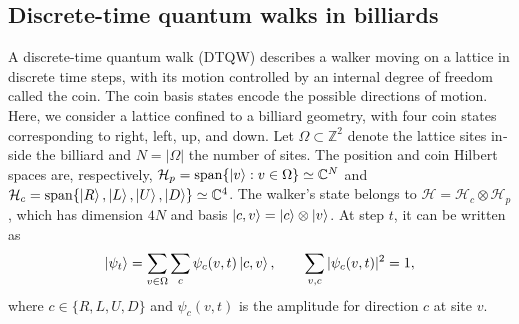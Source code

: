 \tableofcontents
\newpage
\begin{otherlanguage}{english}
\section{Discrete-time quantum walks in billiards} %
\label{sec:dtqw-billiards}

A discrete-time quantum walk (DTQW) describes a walker moving on a lattice 
in discrete time steps, with its motion controlled by an internal degree of 
freedom called the coin. The coin basis states encode the possible directions 
of motion. Here, we consider a lattice confined to a billiard geometry, with 
four coin states corresponding to right, left, up, and down.
Let $\Omega\subset\mathbb Z^2$ denote the lattice sites inside the billiard 
and $N=|\Omega|$ the number of sites. The position and coin Hilbert spaces 
are, respectively,
$\mathcal H_p=\operatorname{span}\{\ket{v}:v\in\Omega\}\simeq\mathbb C^N$
and
$\mathcal H_c=\operatorname{span}\{\ket{R},\ket{L},\ket{U},\ket{D}\}\simeq\mathbb C^4$.
The walker's state belongs to $\mathcal H=\mathcal H_c\otimes\mathcal H_p$, which has dimension $4N$ and basis $\ket{c,v}=\ket{c}\otimes\ket{v}$. At step $t$, it can be written as
\begin{equation}
    \ket{\psi_t}=\sum_{v\in\Omega}\sum_c
        \psi_c(v,t)\ket{c,v},
    \qquad \sum_{v,c}|\psi_c(v,t)|^2=1,
    \label{eq:walk-state-expansion}
\end{equation}
where $c\in\{R,L,U,D\}$ and $\psi_c(v,t)$ is the amplitude for direction $c$ at site $v$.


\end{otherlanguage}
